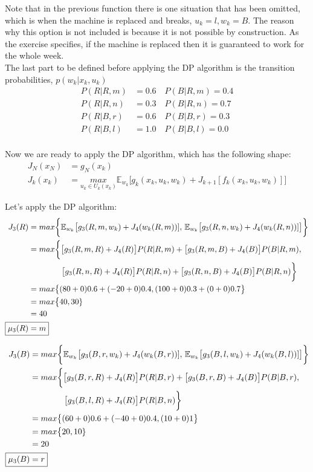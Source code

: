 \documentclass[11pt, oneside]{article}   	%
\begin{document}
Note that in the previous function there is one situation that has been omitted, which is when the machine is replaced and breaks, $u_{k}=l,w_{k}=B$. The reason why this option is not included is because it is not possible by construction. As the exercise specifies, if the machine is replaced then it is guaranteed to work for the whole week.\\

The last part to be defined before applying the DP algorithm is the transition probabilities, $p(w_{k}|x_{k},u_{k})$
\begin{align*}
P(R|R,m)&=0.6 \quad P(B|R,m)=0.4\\
P(R|R,n)&=0.3 \quad P(B|R,n)=0.7\\
P(R|B,r)&=0.6 \quad P(B|B,r)=0.3\\
P(R|B,l)&=1.0 \quad P(B|B,l)=0.0\\
\end{align*}

Now we are ready to apply the DP algorithm, which has the following shape:
\begin{align*}
J_{N}(x_{N}) &= g_{N}(x_{k})\\
J_{k}(x_{k}) &= \underset{u_{k} \in U_{k}(x_{k})}{max} \mathbb{E}_{w_{k}} \big[ g_{k}(x_{k},u_{k},w_{k}) + J_{k+1}[f_{k}(x_{k},u_{k},w_{k})]\big]
\end{align*}

Let's apply the DP algorithm:
\begin{align*}
J_{3}(R) &= max \bigg\{ \mathbb{E}_{w_{k}} \big[ g_{3}(R,m,w_{k}) + J_{4}(w_{k}(R,m))], \, \mathbb{E}_{w_{k}} \big[ g_{3}(R,n,w_{k}) + J_{4}(w_{k}(R,n))] \big] \bigg\}\\
&= max \bigg\{ \big[g_{3}(R,m,R) + J_{4}(R)\big]P(R|R,m) + \big[g_{3}(R,m,B) + J_{4}(B)\big]P(B|R,m),\\
& \quad \quad \quad \quad \, \big[g_{3}(R,n,R) + J_{4}(R)\big]P(R|R,n) + \big[g_{3}(R,n,B) + J_{4}(B)\big]P(B|R,n) \bigg\}\\
&= max \big\{ (80+0)0.6+(-20+0)0.4, (100+0)0.3+(0+0)0.7 \big\}\\
&= max \big\{40,30\}\\
&= 40\\
\Aboxed{\mu_{3}(R)&=m}\\
\end{align*}

\begin{align*}
J_{3}(B) &= max \bigg\{ \mathbb{E}_{w_{k}} \big[ g_{3}(B,r,w_{k}) + J_{4}(w_{k}(B,r))], \, \mathbb{E}_{w_{k}} \big[ g_{3}(B,l,w_{k}) + J_{4}(w_{k}(B,l))] \big] \bigg\}\\
&= max \bigg\{ \big[g_{3}(B,r,R) + J_{4}(R)\big]P(R|B,r) + \big[g_{3}(B,r,B) + J_{4}(B)\big]P(B|B,r),\\
& \quad \quad \quad \quad \, \big[g_{3}(B,l,R) + J_{4}(R)\big]P(R|B,n) \bigg\}\\
&= max \big\{ (60+0)0.6+(-40+0)0.4, (10+0)1 \big\}\\
&= max \big\{20,10\}\\
&= 20\\
\Aboxed{\mu_{3}(B)&=r}\\
\end{align*}
\end{document}
